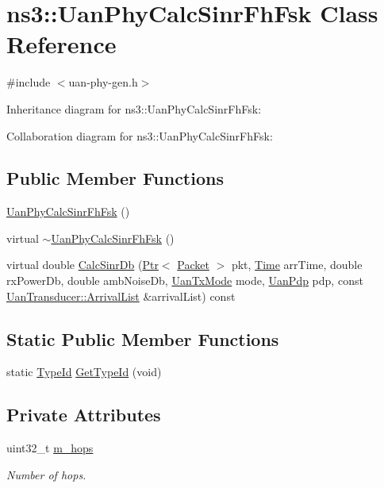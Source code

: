 \hypertarget{classns3_1_1UanPhyCalcSinrFhFsk}{}\section{ns3\+:\+:Uan\+Phy\+Calc\+Sinr\+Fh\+Fsk Class Reference}
\label{classns3_1_1UanPhyCalcSinrFhFsk}


{\ttfamily \#include $<$uan-\/phy-\/gen.\+h$>$}



Inheritance diagram for ns3\+:\+:Uan\+Phy\+Calc\+Sinr\+Fh\+Fsk\+:


Collaboration diagram for ns3\+:\+:Uan\+Phy\+Calc\+Sinr\+Fh\+Fsk\+:
\subsection*{Public Member Functions}
\begin{DoxyCompactItemize}
\item 
\hyperlink{classns3_1_1UanPhyCalcSinrFhFsk_a0b8284d527492e7dfadd160e6e8bab97}{Uan\+Phy\+Calc\+Sinr\+Fh\+Fsk} ()
\item 
virtual \hyperlink{classns3_1_1UanPhyCalcSinrFhFsk_a5eb28cdd599ea53f641901364a733eb3}{$\sim$\+Uan\+Phy\+Calc\+Sinr\+Fh\+Fsk} ()
\item 
virtual double \hyperlink{classns3_1_1UanPhyCalcSinrFhFsk_a6d728e7e7fa4c3ce682bae527d0c7db3}{Calc\+Sinr\+Db} (\hyperlink{classns3_1_1Ptr}{Ptr}$<$ \hyperlink{classns3_1_1Packet}{Packet} $>$ pkt, \hyperlink{classns3_1_1Time}{Time} arr\+Time, double rx\+Power\+Db, double amb\+Noise\+Db, \hyperlink{classns3_1_1UanTxMode}{Uan\+Tx\+Mode} mode, \hyperlink{classns3_1_1UanPdp}{Uan\+Pdp} pdp, const \hyperlink{classns3_1_1UanTransducer_a95332a21e30506421a116d4b5c4dfd75}{Uan\+Transducer\+::\+Arrival\+List} \&arrival\+List) const 
\end{DoxyCompactItemize}
\subsection*{Static Public Member Functions}
\begin{DoxyCompactItemize}
\item 
static \hyperlink{classns3_1_1TypeId}{Type\+Id} \hyperlink{classns3_1_1UanPhyCalcSinrFhFsk_a8a6924587390c3244eae009b52d2fd6e}{Get\+Type\+Id} (void)
\end{DoxyCompactItemize}
\subsection*{Private Attributes}
\begin{DoxyCompactItemize}
\item 
uint32\+\_\+t \hyperlink{classns3_1_1UanPhyCalcSinrFhFsk_ad3f404c81ac8fcc8987c991b51ecb717}{m\+\_\+hops}
\begin{DoxyCompactList}\small\item\em Number of hops. \end{DoxyCompactList}\end{DoxyCompactItemize}
